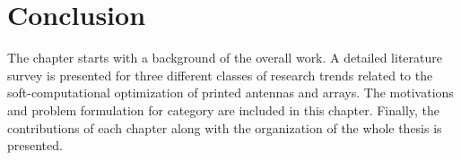\section{Conclusion} \label{c1sec_concl}
The chapter starts with a background of the overall work. A detailed literature survey is presented for three different classes of research trends related to the soft-computational optimization of printed antennas and arrays. The motivations and problem formulation for category are included in this chapter. Finally, the contributions of each chapter along with the organization of the whole thesis is presented. 
